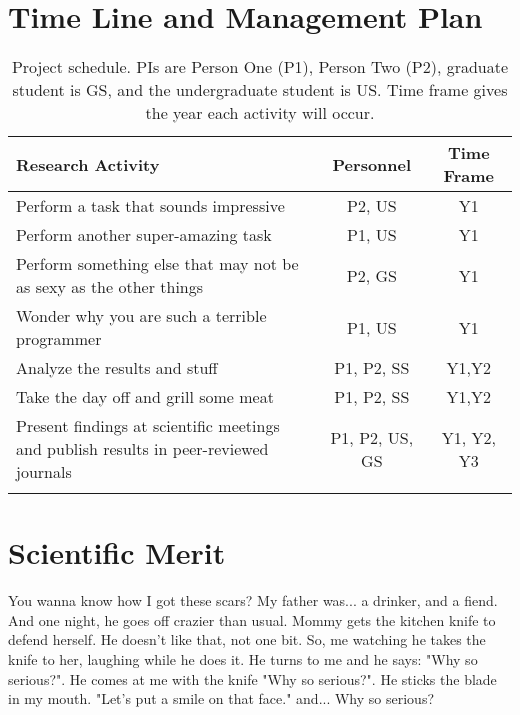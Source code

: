 \section{Time Line and Management Plan}

\begin{table}[H]
\renewcommand{\arraystretch}{0}
\caption{Project schedule.  PIs are Person One (P1), Person Two (P2), graduate student is GS, and the undergraduate student is US. Time frame gives the year each activity will occur.}
\scriptsize
\begin{tabularx}{\textwidth}{Y c c }
\hline
\hline
\textbf{Research Activity} & \textbf{Personnel} & \textbf{Time Frame}\\
\hline
Perform a task that sounds impressive & P2, US & Y1 \T\\
Perform another super-amazing task & P1, US & Y1 \T\\
Perform something else that may not be as sexy as the other things & P2, GS & Y1 \T\\
Wonder why you are such a terrible programmer & P1, US & Y1 \T\\
Analyze the results and stuff & P1, P2, SS & Y1,Y2 \T\\
Take the day off and grill some meat & P1, P2, SS & Y1,Y2 \T\\
Present findings at scientific meetings and publish results in peer-reviewed journals & P1, P2, US, GS & Y1, Y2, Y3\T\B\\
\hline
\hline
\label{table2}
\end{tabularx}
\end{table}


\section{Scientific Merit}

You wanna know how I got these scars? My father was... a drinker, and a fiend. And one night, he goes off crazier than usual. Mommy gets the kitchen knife to defend herself. He doesn't like that, not one bit. So, me watching he takes the knife to her, laughing while he does it. He turns to me and he says: "Why so serious?". He comes at me with the knife "Why so serious?". He sticks the blade in my mouth. "Let's put a smile on that face." and... Why so serious?


